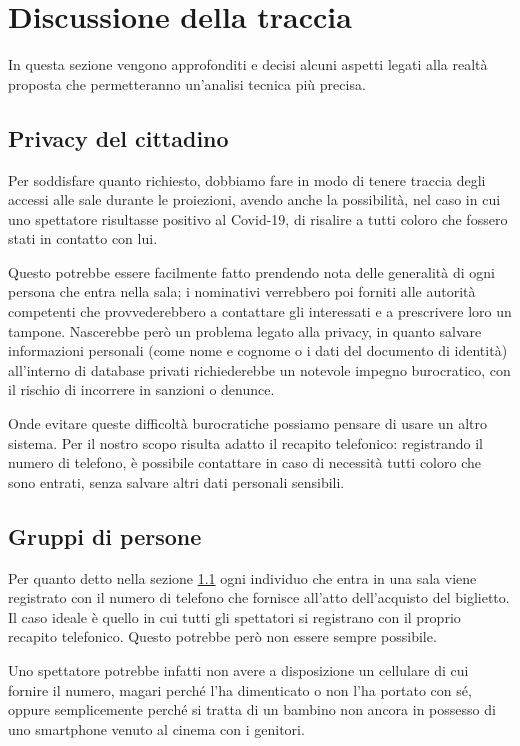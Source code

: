 \documentclass{article}
\begin{document}
\section{Discussione della traccia}\label{sec:Ipotesi}

In questa sezione vengono approfonditi e decisi alcuni aspetti legati alla realtà proposta che permetteranno un'analisi tecnica più precisa.

\subsection{Privacy del cittadino}\label{sec:Privacy}

Per soddisfare quanto richiesto, dobbiamo fare in modo di tenere traccia degli accessi alle sale durante le proiezioni, avendo anche la possibilità, nel caso in cui uno spettatore risultasse positivo al Covid-19, di risalire a tutti coloro che fossero stati in contatto con lui.

Questo potrebbe essere facilmente fatto prendendo nota delle generalità di ogni persona che entra nella sala; i nominativi verrebbero poi forniti alle autorità competenti che provvederebbero a contattare gli interessati e a prescrivere loro un tampone.
Nascerebbe però un problema legato alla privacy, in quanto salvare informazioni personali (come nome e cognome o i dati del documento di identità) all'interno di database privati richiederebbe un notevole impegno burocratico, con il rischio di incorrere in sanzioni o denunce.

Onde evitare queste difficoltà burocratiche possiamo pensare di usare un altro sistema. Per il nostro scopo risulta adatto il recapito telefonico: registrando il numero di telefono, è possibile contattare in caso di necessità tutti coloro che sono entrati, senza salvare altri dati personali sensibili.

\subsection{Gruppi di persone}\label{sec:Gruppi}

Per quanto detto nella sezione \ref{sec:Privacy} ogni individuo che entra in una sala viene registrato con il numero di telefono che fornisce all'atto dell'acquisto del biglietto. Il caso ideale è quello in cui tutti gli spettatori si registrano con il proprio recapito telefonico. Questo potrebbe però non essere sempre possibile.

Uno spettatore potrebbe infatti non avere a disposizione un cellulare di cui fornire il numero, magari perché l'ha dimenticato o non l'ha portato con sé, oppure semplicemente perché si tratta di un bambino non ancora in possesso di uno smartphone venuto al cinema con i genitori.
\end{document}
